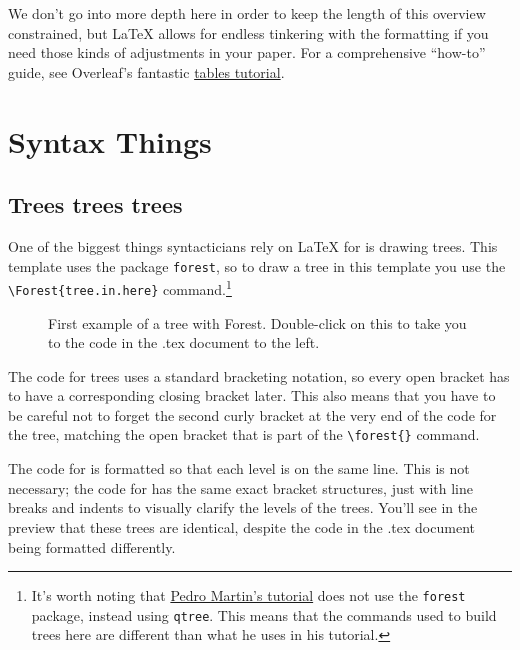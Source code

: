 \documentclass[output=paper,colorlinks,citecolor=brown,
]{langscibook}
\begin{document}
We don't go into more depth here in order to keep the length of this overview constrained, but \LaTeX{} allows for endless tinkering with the formatting if you need those kinds of adjustments in your paper. For a comprehensive ``how-to'' guide, see Overleaf's fantastic \href{https://www.overleaf.com/learn/latex/Tables}{tables tutorial}. 

\section{Syntax Things} \label{sec:diercks:Syntax}

\subsection{Trees trees trees}

One of the biggest things syntacticians rely on \LaTeX{} for is drawing trees. This template uses the package \texttt{forest}, so to draw a tree in this template you use the \verb|\Forest{tree.in.here}| command.\footnote{It's worth noting that \href{http://ptmartins.info/latex/}{Pedro Martin's tutorial} does not use the \texttt{forest} package, instead using \texttt{qtree}. This means that the commands used to build trees here are different than what he uses in his tutorial.} 

\begin{figure}
\caption{First example of a tree with Forest. Double-click on this to take you to the code in the .tex document to the left.}
  \label{fig:diercks:FirstTree}
\Forest{
[VP [V\xhead] [NP] ] 
} %
\end{figure}

\noindent The code for trees uses a standard bracketing notation, so every open bracket has to have a corresponding closing bracket later. This also means that you have to be careful not to forget the second curly bracket at the very end of the code for the tree, matching the open bracket that is part of the \verb|\forest{}| command.



The code for  is formatted so that each level is on the same line. This is not necessary; the code for  has the same exact bracket structures, just with line breaks and indents to visually clarify the levels of the trees. You'll see in the preview that these trees are identical, despite the code in the .tex document being formatted differently.
\end{document}
